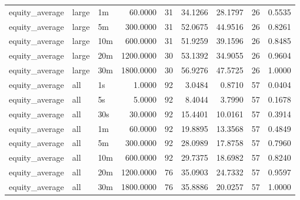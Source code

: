 \begin{tabular}{lllrrrrrr}
equity_average & large & 1m & 60.0000 & 31 & 34.1266 & 28.1797 & 26 & 0.5535 \\
equity_average & large & 5m & 300.0000 & 31 & 52.0675 & 44.9516 & 26 & 0.8261 \\
equity_average & large & 10m & 600.0000 & 31 & 51.9259 & 39.1596 & 26 & 0.8485 \\
equity_average & large & 20m & 1200.0000 & 30 & 53.1392 & 34.9055 & 26 & 0.9604 \\
equity_average & large & 30m & 1800.0000 & 30 & 56.9276 & 47.5725 & 26 & 1.0000 \\
equity_average & all & 1s & 1.0000 & 92 & 3.0484 & 0.8710 & 57 & 0.0404 \\
equity_average & all & 5s & 5.0000 & 92 & 8.4044 & 3.7990 & 57 & 0.1678 \\
equity_average & all & 30s & 30.0000 & 92 & 15.4401 & 10.0161 & 57 & 0.3914 \\
equity_average & all & 1m & 60.0000 & 92 & 19.8895 & 13.3568 & 57 & 0.4849 \\
equity_average & all & 5m & 300.0000 & 92 & 28.0989 & 17.8758 & 57 & 0.7960 \\
equity_average & all & 10m & 600.0000 & 92 & 29.7375 & 18.6982 & 57 & 0.8240 \\
equity_average & all & 20m & 1200.0000 & 76 & 35.0903 & 24.7332 & 57 & 0.9597 \\
equity_average & all & 30m & 1800.0000 & 76 & 35.8886 & 20.0257 & 57 & 1.0000 \\
\bottomrule
\end{tabular}
